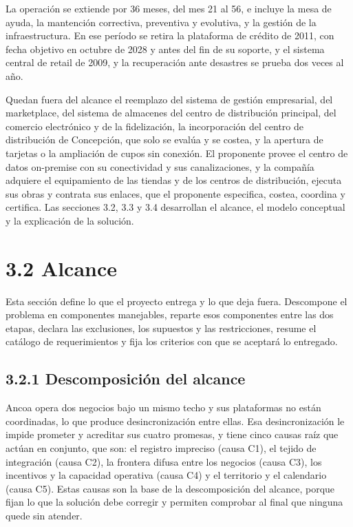 \documentclass[11pt]{article}
\begin{document}

La operación se extiende por 36 meses, del mes 21 al 56, e incluye la mesa de ayuda, la mantención correctiva, preventiva y evolutiva, y la gestión de la infraestructura. En ese período se retira la plataforma de crédito de 2011, con fecha objetivo en octubre de 2028 y antes del fin de su soporte, y el sistema central de retail de 2009, y la recuperación ante desastres se prueba dos veces al año.

Quedan fuera del alcance el reemplazo del sistema de gestión empresarial, del marketplace, del sistema de almacenes del centro de distribución principal, del comercio electrónico y de la fidelización, la incorporación del centro de distribución de Concepción, que solo se evalúa y se costea, y la apertura de tarjetas o la ampliación de cupos sin conexión. El proponente provee el centro de datos on-premise con su conectividad y sus canalizaciones, y la compañía adquiere el equipamiento de las tiendas y de los centros de distribución, ejecuta sus obras y contrata sus enlaces, que el proponente especifica, costea, coordina y certifica. Las secciones 3.2, 3.3 y 3.4 desarrollan el alcance, el modelo conceptual y la explicación de la solución.

\section{3.2 Alcance}

Esta sección define lo que el proyecto entrega y lo que deja fuera. Descompone el problema en componentes manejables, reparte esos componentes entre las dos etapas, declara las exclusiones, los supuestos y las restricciones, resume el catálogo de requerimientos y fija los criterios con que se aceptará lo entregado.

\subsection{3.2.1 Descomposición del alcance}

Ancoa opera dos negocios bajo un mismo techo y sus plataformas no están coordinadas, lo que produce desincronización entre ellas. Esa desincronización le impide prometer y acreditar sus cuatro promesas, y tiene cinco causas raíz que actúan en conjunto, que son: el registro impreciso (causa C1), el tejido de integración (causa C2), la frontera difusa entre los negocios (causa C3), los incentivos y la capacidad operativa (causa C4) y el territorio y el calendario (causa C5). Estas causas son la base de la descomposición del alcance, porque fijan lo que la solución debe corregir y permiten comprobar al final que ninguna quede sin atender.
\end{document}
